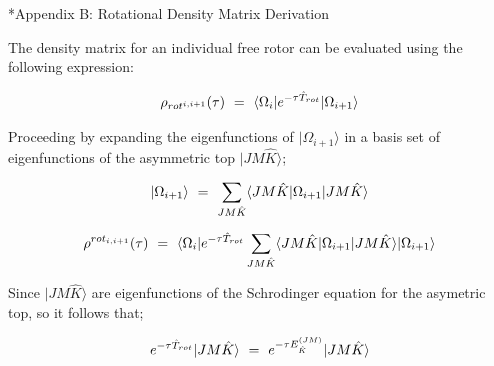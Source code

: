 \documentclass[11pt]{article}
\makeatletter
\let\workreportsection\section
\renewcommand{\section}{\@ifstar{\workreportstarsection}{\workreportsection}}
\newcommand{\workreportstarsection}[1]{\workreportsection*{#1}\addcontentsline{toc}{section}{#1}}
\makeatother
\begin{document}
\hypertarget{wr-appendix-b}{}
\section*{Appendix B: Rotational Density Matrix Derivation}
\label{wr-app-scdappx-1}

The density matrix for an individual free rotor can be evaluated using the following expression:

\begin{equation}
    \rho_{rot^{i, i+1}} ( \tau ) \hspace{0.125cm} = \hspace{0.125cm} \langle \Omega_{i} | e^{- \tau \hat{T}_{rot}} | \Omega_{i+1} \rangle  
\end{equation}

Proceeding by expanding the eigenfunctions of \begin{math} | \Omega_{i+1} \rangle \end{math} in a basis set of eigenfunctions of the asymmetric top \begin{math} | JM\hat{K} \rangle  \end{math};

\begin{equation}
    | \Omega_{i+1} \rangle \hspace{0.125cm} = \hspace{0.125cm} \sum_{J M \hat{K}} \langle JM\hat{K} | \Omega_{i+1} | JM\hat{K} \rangle  
\end{equation}

\begin{equation}
    \rho^{rot_{i, i+1}} ( \tau ) \hspace{0.125cm} = \hspace{0.125cm} \langle \Omega_{i} | e^{- \tau \hat{T}_{rot}} \sum_{J M \hat{K}} \langle JM\hat{K} | \Omega_{i+1} | JM\hat{K} \rangle | \Omega_{i+1} \rangle 
\end{equation}

Since \begin{math} | JM\hat{K} \rangle  \end{math} are eigenfunctions of the Schrodinger equation for the asymetric top, so it follows that;

\begin{equation}
 e^{- \tau \hat{T}_{rot}}| JM\hat{K} \rangle \hspace{0.125cm} = \hspace{0.125cm}  e^{- \tau E_{\hat{K}}^{(JM)}}| JM\hat{K} \rangle 
\end{equation}
\end{document}
